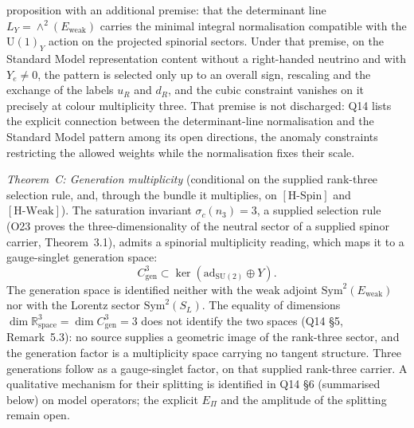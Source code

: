 \documentclass[11pt,a4paper]{article}
\theoremstyle{definition}
\newcommand{\SU}{\mathrm{SU}}
\newcommand{\UU}{\mathrm{U}}
\newcommand{\Epi}{E_\Pi}
\newcommand{\Cgen}{C^3_{\mathrm{gen}}}
\newcommand{\Ew}{E_{\mathrm{weak}}}
\newcommand{\HSpin}{\ensuremath{[\mathrm{H\text{-}Spin}]}}
\newcommand{\HWeak}{\ensuremath{[\mathrm{H\text{-}Weak}]}}
\begin{document}
      proposition with an additional premise: that the determinant line $L_Y = \wedge^2(\Ew)$
      carries the minimal integral normalisation compatible with the $\UU(1)_Y$ action on the
      projected spinorial sectors.
      Under that premise, on the Standard Model representation content without a right-handed neutrino and with
      $Y_e \neq 0$, the pattern is selected only up to an overall sign, rescaling and the exchange of the labels
      $u_R$ and $d_R$, and the cubic constraint vanishes on it precisely at colour multiplicity three.
      That premise is not discharged: Q14 lists the explicit connection between the determinant-line
      normalisation and the Standard Model pattern among its open directions, the anomaly
      constraints restricting the allowed weights while the normalisation fixes their scale.

      \textit{Theorem~C: Generation multiplicity} (conditional on the supplied rank-three selection rule, and, through
      the bundle it multiplies, on \HSpin{} and \HWeak{}).
      The saturation invariant $\sigma_c(n_3) = 3$, a supplied selection rule (O23 proves the
      three-dimensionality of the neutral sector of a supplied spinor carrier, Theorem~3.1),
      admits a spinorial multiplicity reading, which maps it to a gauge-singlet
      generation space:
      \[
        \Cgen \subset \ker(\mathrm{ad}_{\SU(2)} \oplus Y).
      \]
      The generation space is identified neither with the weak adjoint $\mathrm{Sym}^2(\Ew)$ nor with the Lorentz
      sector $\mathrm{Sym}^2(S_L)$.
      The equality of dimensions $\dim\mathbb{R}^3_{\mathrm{space}} = \dim\Cgen = 3$ does not identify the two spaces
      (Q14 \S5, Remark~5.3): no source supplies a geometric image of the rank-three sector, and the generation factor
      is a multiplicity space carrying no tangent structure.
      Three generations follow as a gauge-singlet factor, on that supplied rank-three carrier.
      A qualitative mechanism for their splitting is identified in Q14 \S6 (summarised below) on model operators; the
      explicit $\Epi$ and the amplitude of the splitting remain open.
\end{document}
